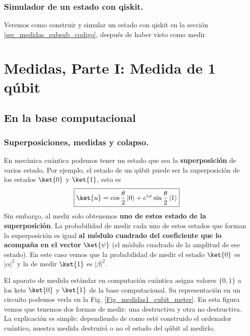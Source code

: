 \documentclass[a4paper,11pt]{book} %
\numberwithin{equation}{chapter}
\begin{document}
		\subsection{Simulador de un estado con qiskit.}
		
Veremos como construir y simular un estado con qiskit en la sección \ref{sec_medidas_subsub_codigo}, después de haber visto como medir.

















\chapter{Medidas, Parte I: Medida de 1 qúbit}

    \section{En la base computacional}
		\subsection{Superposiciones, medidas y colapso.}
	
En mecánica cuántica podemos tener un estado que sea la \textbf{superposición} de varios estado. Por ejemplo, el estado de un qúbit puede ser la superposición de los estados $\ket{0}$ y $\ket{1}$, esto es
	\begin{equation}
	\boxed{\ket{u} = \cos{\frac{\theta}{2}}\, |0\rangle + e^{i\varphi}\sin{\frac{\theta}{2}}\,|1\rangle }
	\end{equation}
Sin embargo, al medir solo obtenemos \textbf{uno de estos estado de la superposición}. La probabilidad de medir cada uno de estos estados que forman la superposición es igual 	\textbf{al módulo cuadrado del coeficiente que lo acompaña en el vector}  $\ket{\psi}$ (el módulo cuadrado de la amplitud de ese estado). En este caso vemos que la probabilidad de medir el estado $\ket{0}$ es $|\alpha|^2$ y la de medir $\ket{1}$ es $|\beta|^2$.


El aparato de medida estándar en computación cuántica asigna valores $\{0,1\}$ a los kets $\ket{0}$ y $\ket{1}$ de la base computacional. Su representación en un circuito podemos verla en la Fig. \ref{Fig_medidas1_cubit_meter}. En esta figura vemos que tenemos dos formas de medir: una destructiva y otra no destructiva. La explicación es simple: dependiendo de como esté construido el ordenador cuántico, nuestra medida destruirá o no el estado del qúbit al medirlo. 
\end{document}
